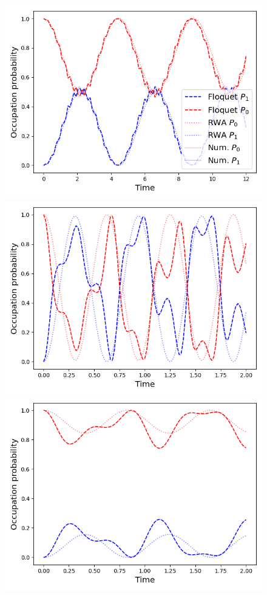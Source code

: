 \documentclass[reprint, amsmath, amssymb, aps]{revtex4-2}
\begin{document}
\begin{figure}
\includegraphics[scale=0.46]{F1}
\includegraphics[scale=0.46]{F2}
\includegraphics[scale=0.46]{F4}

\end{figure}
\end{document}
